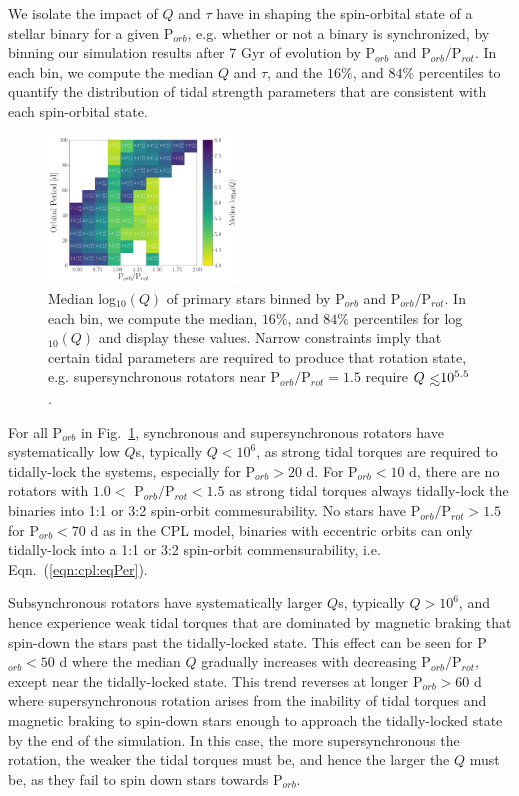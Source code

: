 \documentclass[twocolumn]{aastex61}
\def\lsim{~\rlap{$<$}{\lower 1.0ex\hbox{$\sim$}}}
\begin{document}
We isolate the impact of $Q$ and $\tau$ have in shaping the spin-orbital state of a stellar binary for a given P$_{orb}$, e.g. whether or not a binary is synchronized, by binning our simulation results after 7 Gyr of evolution by P$_{orb}$ and P$_{orb}/$P$_{rot}$.  In each bin, we compute the median $Q$ and $\tau$, and the $16\%$, and $84\%$ percentiles to quantify the distribution of tidal strength parameters that are consistent with each spin-orbital state.  

\begin{figure}
	\includegraphics[width=0.45\textwidth]{../Plots/porbProtPorbQHist.pdf}
   \caption{Median log$_{10}(Q)$ of primary stars binned by P$_{orb}$ and P$_{orb}/$P$_{rot}$.  In each bin, we compute the median, $16\%$, and $84\%$ percentiles for log$_{10}(Q)$ and display these values. Narrow constraints imply that certain tidal parameters are required to produce that rotation state, e.g. supersynchronous rotators near P$_{orb}/$P$_{rot} = 1.5$ require $Q \lsim 10^{5.5}$. }%
    \label{fig:qmap}%
\end{figure}

For all P$_{orb}$ in Fig.~\ref{fig:qmap}, synchronous and supersynchronous rotators have systematically low $Q$s, typically $Q < 10^6$, as strong tidal torques are required to tidally-lock the systems, especially for P$_{orb} > 20$ d. For P$_{orb} < 10$ d, there are no rotators with $1.0 <$ P$_{orb}/$P$_{rot} < 1.5$ as strong tidal torques always tidally-lock the binaries into 1:1 or 3:2 spin-orbit commesurability. No stars have P$_{orb}/$P$_{rot} > 1.5$ for P$_{orb} < 70$ d as in the CPL model, binaries with eccentric orbits can only tidally-lock into a 1:1 or 3:2 spin-orbit commensurability, i.e. Eqn.~(\ref{eqn:cpl:eqPer}).   

Subsynchronous rotators have systematically larger $Q$s, typically $Q > 10^6$, and hence experience weak tidal torques that are dominated by magnetic braking that spin-down the stars past the tidally-locked state.  This effect can be seen for P$_{orb} < 50$ d where the median $Q$ gradually increases with decreasing P$_{orb}/$P$_{rot}$, except near the tidally-locked state.  This trend reverses at longer P$_{orb} > 60$ d where supersynchronous rotation arises from the inability of tidal torques and magnetic braking to spin-down stars enough to approach the tidally-locked state by the end of the simulation.  In this case, the more supersynchronous the rotation, the weaker the tidal torques must be, and hence the larger the $Q$ must be, as they fail to spin down stars towards P$_{orb}$. 
\end{document}
